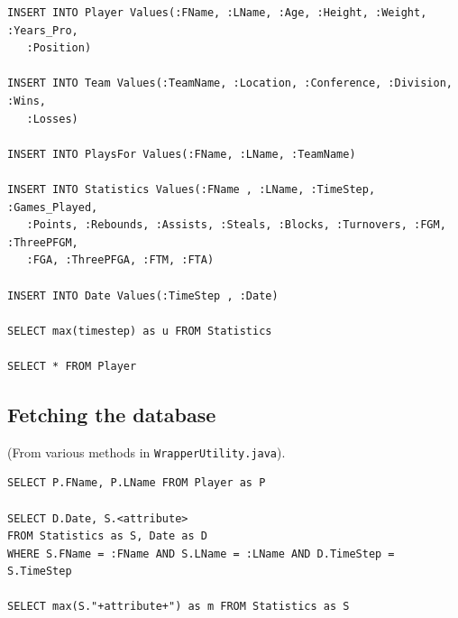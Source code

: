\documentclass[paper=A4, fontsize=11pt]{scrartcl} %
\begin{document}
\begin{verbatim}
INSERT INTO Player Values(:FName, :LName, :Age, :Height, :Weight, :Years_Pro,
   :Position)
                
INSERT INTO Team Values(:TeamName, :Location, :Conference, :Division, :Wins,
   :Losses)
                            
INSERT INTO PlaysFor Values(:FName, :LName, :TeamName)
                                        
INSERT INTO Statistics Values(:FName , :LName, :TimeStep, :Games_Played,
   :Points, :Rebounds, :Assists, :Steals, :Blocks, :Turnovers, :FGM, :ThreePFGM,
   :FGA, :ThreePFGA, :FTM, :FTA)
                    
INSERT INTO Date Values(:TimeStep , :Date)
                            
SELECT max(timestep) as u FROM Statistics
                                    
SELECT * FROM Player
\end{verbatim}

\subsection{Fetching the database}
(From various methods in \verb!WrapperUtility.java!).

\begin{verbatim}
SELECT P.FName, P.LName FROM Player as P
        
SELECT D.Date, S.<attribute> 
FROM Statistics as S, Date as D 
WHERE S.FName = :FName AND S.LName = :LName AND D.TimeStep = S.TimeStep
        
SELECT max(S."+attribute+") as m FROM Statistics as S                
\end{verbatim}
\end{document}
